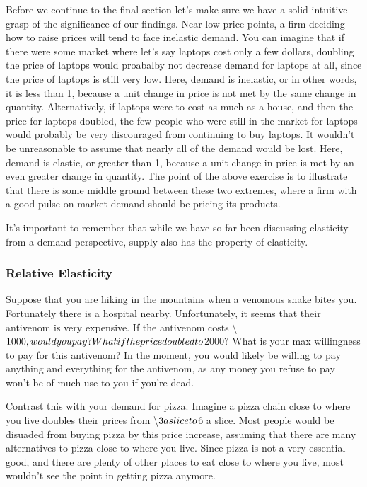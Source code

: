 \documentclass[letterpaper,10pt,english]{jupyterBook}
\begin{document}
\sphinxAtStartPar
Before we continue to the final section let’s make sure we have a solid intuitive grasp of the significance of our findings. Near low price points, a firm deciding how to raise prices will tend to face inelastic demand. You can imagine that if there were some market where let’s say laptops cost only a few dollars, doubling the price of laptops would proabalby not decrease demand for laptops at all, since the price of laptops is still very low. Here, demand is inelastic, or in other words, it is less than 1, because a unit change in price is not met by the same change in quantity. Alternatively, if laptops were to cost as much as a house, and then the price for laptops doubled, the few people who were still in the market for laptops would probably be very discouraged from continuing to buy laptops. It wouldn’t be unreasonable to assume that nearly all of the demand would be lost. Here, demand is elastic, or greater than 1, because a unit change in price is met by an even greater change in quantity. The point of the above exercise is to illustrate that there is some middle ground between these two extremes, where a firm with a good pulse on market demand should be pricing its products.

\sphinxAtStartPar
It’s important to remember that while we have so far been discussing elasticity from a demand perspective, supply also has the property of elasticity.


\subsubsection{Relative Elasticity}
\label{\detokenize{content/01-demand/04-elasticity:relative-elasticity}}
\sphinxAtStartPar
Suppose that you are hiking in the mountains when a venomous snake bites you. Fortunately there is a hospital nearby. Unfortunately, it seems that their antivenom is very expensive. If the antivenom costs \textbackslash{}\(1000, would you pay? What if the price doubled to \\\)2000? What is your max willingness to pay for this antivenom? In the moment, you would likely be willing to pay anything and everything for the antivenom, as any money you refuse to pay won’t be of much use to you if you’re dead.

\sphinxAtStartPar
Contrast this with your demand for pizza. Imagine a pizza chain close to where you live doubles their prices from \textbackslash{}\(3 a slice to \\\)6 a slice. Most people would be disuaded from buying pizza by this price increase, assuming that there are many alternatives to pizza close to where you live. Since pizza is not a very essential good, and there are plenty of other places to eat close to where you live, most wouldn’t see the point in getting pizza anymore.
\end{document}
